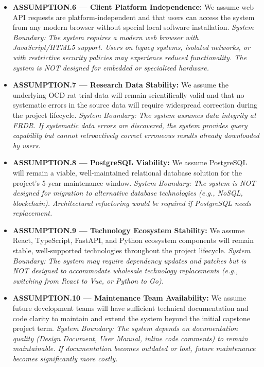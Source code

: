 \documentclass[12pt]{article}
\begin{document}
\begin{itemize}
    \item \textbf{ASSUMPTION.6 --- Client Platform Independence:} We assume web API requests are platform-independent and that users can access the system from any modern browser without special local software installation. \textit{System Boundary: The system requires a modern web browser with JavaScript/HTML5 support. Users on legacy systems, isolated networks, or with restrictive security policies may experience reduced functionality. The system is NOT designed for embedded or specialized hardware.}
    
    \item \textbf{ASSUMPTION.7 --- Research Data Stability:} We assume the underlying OCD rat trial data will remain scientifically valid and that no systematic errors in the source data will require widespread correction during the project lifecycle. \textit{System Boundary: The system assumes data integrity at FRDR. If systematic data errors are discovered, the system provides query capability but cannot retroactively correct erroneous results already downloaded by users.}
    
    \item \textbf{ASSUMPTION.8 --- PostgreSQL Viability:} We assume PostgreSQL will remain a viable, well-maintained relational database solution for the project's 5-year maintenance window. \textit{System Boundary: The system is NOT designed for migration to alternative database technologies (e.g., NoSQL, blockchain). Architectural refactoring would be required if PostgreSQL needs replacement.}
    
    \item \textbf{ASSUMPTION.9 --- Technology Ecosystem Stability:} We assume React, TypeScript, FastAPI, and Python ecosystem components will remain stable, well-supported technologies throughout the project lifecycle. \textit{System Boundary: The system may require dependency updates and patches but is NOT designed to accommodate wholesale technology replacements (e.g., switching from React to Vue, or Python to Go).}
    
    \item \textbf{ASSUMPTION.10 --- Maintenance Team Availability:} We assume future development teams will have sufficient technical documentation and code clarity to maintain and extend the system beyond the initial capstone project term. \textit{System Boundary: The system depends on documentation quality (Design Document, User Manual, inline code comments) to remain maintainable. If documentation becomes outdated or lost, future maintenance becomes significantly more costly.}
    

\end{itemize}
\end{document}

